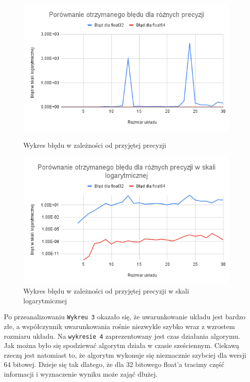 \documentclass{article}
\begin{document}
\begin{figure}[H]
  \begin{minipage}[b]{0.49\textwidth}
    \includegraphics[width=\textwidth]{img01.png}
    \caption{Wykres błędu w zależności od przyjętej precyzji}
  \end{minipage}
  \hfill
  \begin{minipage}[b]{0.49\textwidth}
    \includegraphics[width=\textwidth]{img02.png}
    \caption{Wykres błędu w zależności od przyjętej precyzji w skali logarytmicznej }
  \end{minipage}
\end{figure}

\noindent
Po przeanalizowaniu \texttt{Wykreu 3} okazało się, że  uwarunkowanie układu jest bardzo złe, a współczynnik uwarunkowania rośnie niezwykle szybko wraz z wzrostem rozmiaru układu. Na \texttt{wykresie 4} zaprezentowany jest czas działania algorymu. Jak można było się spodziewać algorytm działa w czasie sześciennym. Ciekawą rzeczą jest natomiast to, że algorytm wykonuje się nieznacznie szybciej dla wersji 64 bitowej. Dzieje się tak dlatego, że dla 32 bitowego float'a tracimy część informacji i wyznaczenie wyniku może zająć dłużej.
\end{document}
